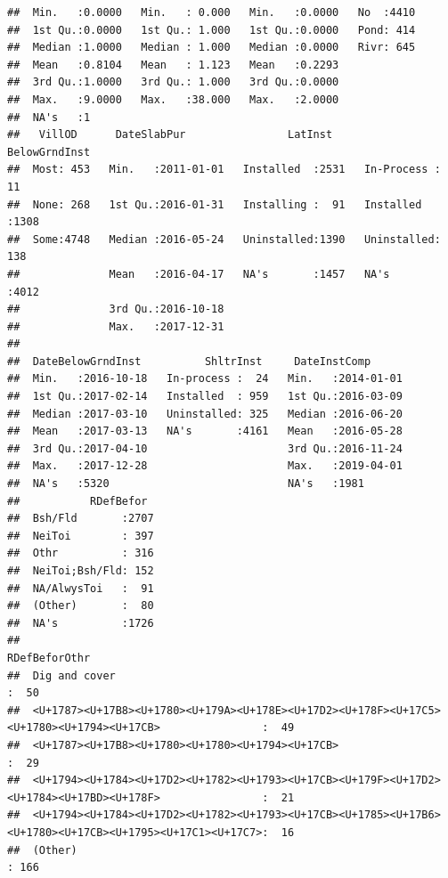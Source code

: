 \documentclass[11pt,]{article}
\begin{document}
\begin{verbatim}
##  Min.   :0.0000   Min.   : 0.000   Min.   :0.0000   No  :4410  
##  1st Qu.:0.0000   1st Qu.: 1.000   1st Qu.:0.0000   Pond: 414  
##  Median :1.0000   Median : 1.000   Median :0.0000   Rivr: 645  
##  Mean   :0.8104   Mean   : 1.123   Mean   :0.2293              
##  3rd Qu.:1.0000   3rd Qu.: 1.000   3rd Qu.:0.0000              
##  Max.   :9.0000   Max.   :38.000   Max.   :2.0000              
##  NA's   :1                                                     
##   VillOD      DateSlabPur                LatInst         BelowGrndInst 
##  Most: 453   Min.   :2011-01-01   Installed  :2531   In-Process :  11  
##  None: 268   1st Qu.:2016-01-31   Installing :  91   Installed  :1308  
##  Some:4748   Median :2016-05-24   Uninstalled:1390   Uninstalled: 138  
##              Mean   :2016-04-17   NA's       :1457   NA's       :4012  
##              3rd Qu.:2016-10-18                                        
##              Max.   :2017-12-31                                        
##                                                                        
##  DateBelowGrndInst          ShltrInst     DateInstComp       
##  Min.   :2016-10-18   In-process :  24   Min.   :2014-01-01  
##  1st Qu.:2017-02-14   Installed  : 959   1st Qu.:2016-03-09  
##  Median :2017-03-10   Uninstalled: 325   Median :2016-06-20  
##  Mean   :2017-03-13   NA's       :4161   Mean   :2016-05-28  
##  3rd Qu.:2017-04-10                      3rd Qu.:2016-11-24  
##  Max.   :2017-12-28                      Max.   :2019-04-01  
##  NA's   :5320                            NA's   :1981        
##           RDefBefor   
##  Bsh/Fld       :2707  
##  NeiToi        : 397  
##  Othr          : 316  
##  NeiToi;Bsh/Fld: 152  
##  NA/AlwysToi   :  91  
##  (Other)       :  80  
##  NA's          :1726  
##                                                                                                   RDefBeforOthr 
##  Dig and cover                                                                                           :  50  
##  <U+1787><U+17B8><U+1780><U+179A><U+178E><U+17D2><U+178F><U+17C5><U+1780><U+1794><U+17CB>                :  49  
##  <U+1787><U+17B8><U+1780><U+1780><U+1794><U+17CB>                                                        :  29  
##  <U+1794><U+1784><U+17D2><U+1782><U+1793><U+17CB><U+179F><U+17D2><U+1784><U+17BD><U+178F>                :  21  
##  <U+1794><U+1784><U+17D2><U+1782><U+1793><U+17CB><U+1785><U+17B6><U+1780><U+17CB><U+1795><U+17C1><U+17C7>:  16  
##  (Other)                                                                                                 : 166  

\end{verbatim}
\end{document}
